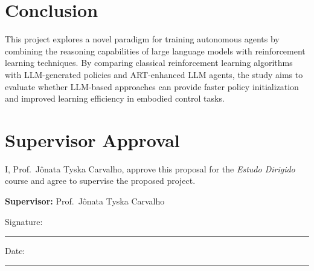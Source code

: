 \documentclass[12pt]{article}
\begin{document}
\section{Conclusion}

This project explores a novel paradigm for training autonomous agents by combining the reasoning capabilities of large language models with reinforcement learning techniques. By comparing classical reinforcement learning algorithms with LLM-generated policies and ART-enhanced LLM agents, the study aims to evaluate whether LLM-based approaches can provide faster policy initialization and improved learning efficiency in embodied control tasks.

\printbibliography

\section*{Supervisor Approval}

I, Prof.\ Jônata Tyska Carvalho, approve this proposal for the \textit{Estudo Dirigido} course and agree to supervise the proposed project.

\vspace{1.5cm}

\noindent
\textbf{Supervisor:} Prof.\ Jônata Tyska Carvalho

\vspace{1.2cm}

\noindent
Signature:\rule{7cm}{0.4pt}

\vspace{0.8cm}

\noindent
Date:\rule{4cm}{0.4pt}
\end{document}

